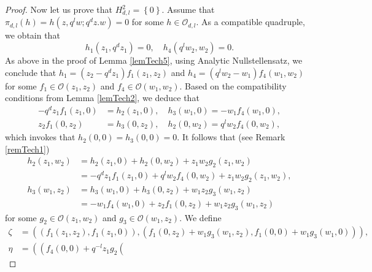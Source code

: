 \documentclass[12pt,reqno]{amsart}%
\theoremstyle{plain}
\numberwithin{theorem}{section} \numberwithin{equation}{section}
\numberwithin{lemma}{section}
\numberwithin{remark}{section}
\numberwithin{example}{section}
\numberwithin{proposition}{section}
\numberwithin{definition}{section}
\numberwithin{corollary}{section}
\begin{document}
\begin{proof}
Now let us prove that $H_{d,l}^{2}=\left\{  0\right\}  $. Assume that
$\pi_{d,l}\left(  h\right)  =h\left(  z,q^{l}w;q^{d}z.w\right)  =0$ for some
$h\in\mathcal{O}_{d,l}$. As a compatible quadruple, we obtain that
\[
h_{1}\left(  z_{1},q^{d}z_{1}\right)  =0,\quad h_{4}\left(  q^{l}w_{2}%
,w_{2}\right)  =0.
\]
As above in the proof of Lemma \ref{lemTech5}, using Analytic Nullstellensatz,
we conclude that $h_{1}=\left(  z_{2}-q^{d}z_{1}\right)  f_{1}\left(
z_{1},z_{2}\right)  $ and $h_{4}=\left(  q^{l}w_{2}-w_{1}\right)  f_{4}\left(
w_{1},w_{2}\right)  $ for some $f_{1}\in\mathcal{O}\left(  z_{1},z_{2}\right)
$ and $f_{4}\in\mathcal{O}\left(  w_{1},w_{2}\right)  $. Based on the
compatibility conditions from Lemma \ref{lemTech2}, we deduce that%
\begin{align*}
-q^{d}z_{1}f_{1}\left(  z_{1},0\right)   &  =h_{2}\left(  z_{1},0\right)
,\quad h_{3}\left(  w_{1},0\right)  =-w_{1}f_{4}\left(  w_{1},0\right)  ,\\
z_{2}f_{1}\left(  0,z_{2}\right)   &  =h_{3}\left(  0,z_{2}\right)  ,\quad
h_{2}\left(  0,w_{2}\right)  =q^{l}w_{2}f_{4}\left(  0,w_{2}\right)  ,
\end{align*}
which invokes that $h_{2}\left(  0,0\right)  =h_{3}\left(  0,0\right)  =0$. It
follows that (see Remark \ref{remTech1})
\begin{align*}
h_{2}\left(  z_{1},w_{2}\right)   &  =h_{2}\left(  z_{1},0\right)
+h_{2}\left(  0,w_{2}\right)  +z_{1}w_{2}g_{2}\left(  z_{1},w_{2}\right) \\
&  =-q^{d}z_{1}f_{1}\left(  z_{1},0\right)  +q^{l}w_{2}f_{4}\left(
0,w_{2}\right)  +z_{1}w_{2}g_{2}\left(  z_{1},w_{2}\right)  ,\\
h_{3}\left(  w_{1},z_{2}\right)   &  =h_{3}\left(  w_{1},0\right)
+h_{3}\left(  0,z_{2}\right)  +w_{1}z_{2}g_{3}\left(  w_{1},z_{2}\right) \\
&  =-w_{1}f_{4}\left(  w_{1},0\right)  +z_{2}f_{1}\left(  0,z_{2}\right)
+w_{1}z_{2}g_{3}\left(  w_{1},z_{2}\right)
\end{align*}
for some $g_{2}\in\mathcal{O}\left(  z_{1},w_{2}\right)  $ and $g_{3}%
\in\mathcal{O}\left(  w_{1},z_{2}\right)  $. We define
\begin{align*}
\zeta &  =\left(  \left(  f_{1}\left(  z_{1},z_{2}\right)  ,f_{1}\left(
z_{1},0\right)  \right)  ,\left(  f_{1}\left(  0,z_{2}\right)  +w_{1}%
g_{3}\left(  w_{1},z_{2}\right)  ,f_{1}\left(  0,0\right)  +w_{1}g_{3}\left(
w_{1},0\right)  \right)  \right)  ,\\
\eta &  =\left(  \left(  f_{4}\left(  0,0\right)  +q^{-l}z_{1}g_{2}\left(

\end{align*}
\end{proof}
\end{document}
